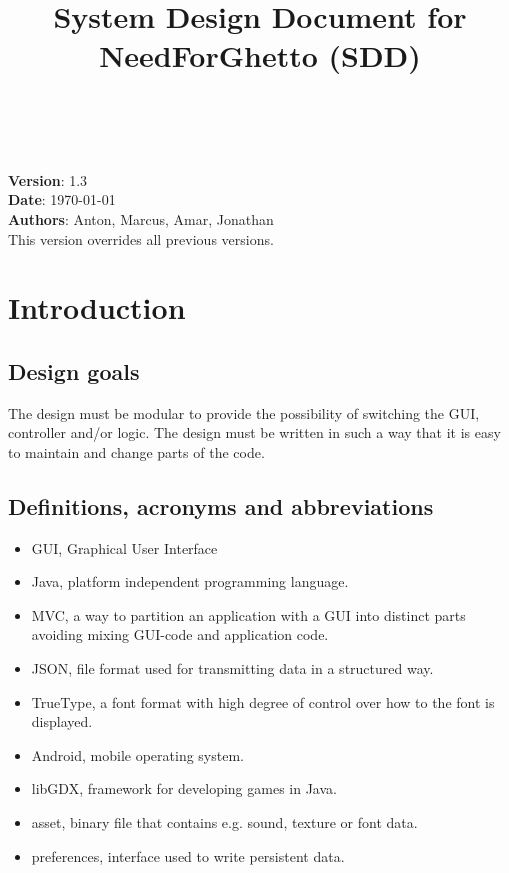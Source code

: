 \documentclass{article}
\begin{document}
\title{System Design Document for NeedForGhetto (SDD)}
\author{}
\date{}
\maketitle

\tableofcontents

\noindent
\\
\\
\textbf{Version}: 1.3 \\
\textbf{Date}: \today \\
\textbf{Authors}: Anton, Marcus, Amar, Jonathan \\
This version overrides all previous versions.

\section{Introduction}
\subsection{Design goals}
The design must be modular to provide the possibility of switching the GUI, controller and/or logic. The design must be written in such a way that it is easy to maintain and change parts of the code.
 
\subsection{Definitions, acronyms and abbreviations}
\begin{itemize}
  \item GUI, Graphical User Interface
  \item Java, platform independent programming language.
  \item MVC, a way to partition an application with a GUI into distinct parts avoiding
  mixing GUI-code and application code.
  \item JSON, file format used for transmitting data in a structured way.
  \item TrueType, a font format with high degree of control over how to the font is displayed.
  \item Android, mobile operating system. 
  \item libGDX, framework for developing games in Java.
  \item asset, binary file that contains e.g. sound, texture or font data.
  \item preferences, interface used to write persistent data.
\end{itemize}
\end{document}
